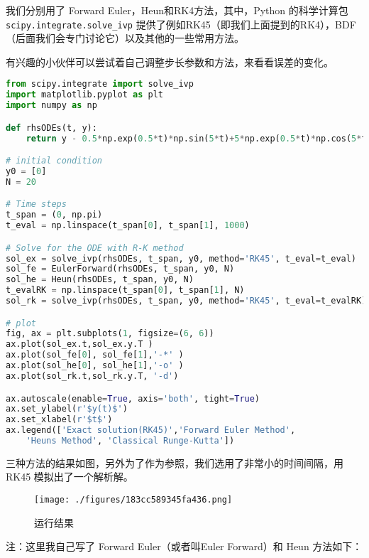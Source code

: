 我们分别用了 Forward Euler，Heun和RK4方法，其中，Python 的科学计算包 \verb|scipy.integrate.solve_ivp| 提供了例如RK45（即我们上面提到的RK4），BDF（后面我们会专门讨论它）以及其他的一些常用方法。

有兴趣的小伙伴可以尝试着自己调整步长参数和方法，来看看误差的变化。
\begin{lstlisting}[language=python]
from scipy.integrate import solve_ivp
import matplotlib.pyplot as plt
import numpy as np

def rhsODEs(t, y):
    return y - 0.5*np.exp(0.5*t)*np.sin(5*t)+5*np.exp(0.5*t)*np.cos(5*t)

# initial condition
y0 = [0]
N = 20

# Time steps
t_span = (0, np.pi)
t_eval = np.linspace(t_span[0], t_span[1], 1000)

# Solve for the ODE with R-K method
sol_ex = solve_ivp(rhsODEs, t_span, y0, method='RK45', t_eval=t_eval)
sol_fe = EulerForward(rhsODEs, t_span, y0, N)
sol_he = Heun(rhsODEs, t_span, y0, N)
t_evalRK = np.linspace(t_span[0], t_span[1], N)
sol_rk = solve_ivp(rhsODEs, t_span, y0, method='RK45', t_eval=t_evalRK)

# plot
fig, ax = plt.subplots(1, figsize=(6, 6))
ax.plot(sol_ex.t,sol_ex.y.T )
ax.plot(sol_fe[0], sol_fe[1],'-*' )
ax.plot(sol_he[0], sol_he[1],'-o' )
ax.plot(sol_rk.t,sol_rk.y.T, '-d')

ax.autoscale(enable=True, axis='both', tight=True)
ax.set_ylabel(r'$y(t)$')
ax.set_xlabel(r'$t$')
ax.legend(['Exact solution(RK45)','Forward Euler Method',
    'Heuns Method', 'Classical Runge-Kutta'])
\end{lstlisting}

三种方法的结果如图，另外为了作为参照，我们选用了非常小的时间间隔，用 RK45 模拟出了一个解析解。

\begin{figure}[ht]
\centering
\texttt{[image: ./figures/183cc589345fa436.png]}
\caption{运行结果} \label{fig_NordEq_4}
\end{figure}

注：这里我自己写了 Forward Euler（或者叫Euler Forward）和 Heun 方法如下：


